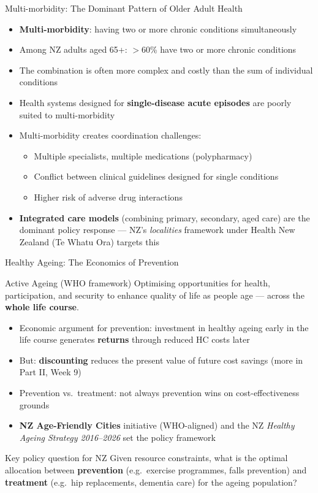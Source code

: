 \documentclass[aspectratio=169, 12pt]{beamer}
\begin{document}
\begin{frame}{Multi-morbidity: The Dominant Pattern of Older Adult Health}
  \begin{itemize}
    \item \textbf{Multi-morbidity}: having two or more chronic conditions simultaneously
    \item Among NZ adults aged 65+: $>$60\% have two or more chronic conditions
    \item The combination is often more complex and costly than the sum of individual conditions
    \item Health systems designed for \textbf{single-disease acute episodes} are poorly
          suited to multi-morbidity
    \item Multi-morbidity creates coordination challenges:
    \begin{itemize}
      \item Multiple specialists, multiple medications (polypharmacy)
      \item Conflict between clinical guidelines designed for single conditions
      \item Higher risk of adverse drug interactions
    \end{itemize}
    \item \textbf{Integrated care models} (combining primary, secondary, aged care) are
          the dominant policy response --- NZ's \textit{localities} framework under Health
          New Zealand (Te Whatu Ora) targets this
  \end{itemize}
\end{frame}

\begin{frame}{Healthy Ageing: The Economics of Prevention}
  \begin{block}{Active Ageing (WHO framework)}
    Optimising opportunities for health, participation, and security to enhance quality of
    life as people age --- across the \textbf{whole life course}.
  \end{block}
  \begin{itemize}
    \item Economic argument for prevention: investment in healthy ageing early in the life
          course generates \textbf{returns} through reduced HC costs later
    \item But: \textbf{discounting} reduces the present value of future cost savings
          (more in Part II, Week 9)
    \item Prevention vs.\ treatment: not always prevention wins on cost-effectiveness grounds
    \item \textbf{NZ Age-Friendly Cities} initiative (WHO-aligned) and the NZ
          \textit{Healthy Ageing Strategy 2016--2026} set the policy framework
  \end{itemize}
  \begin{alertblock}{Key policy question for NZ}
    Given resource constraints, what is the optimal allocation between \textbf{prevention}
    (e.g.\ exercise programmes, falls prevention) and \textbf{treatment} (e.g.\ hip replacements,
    dementia care) for the ageing population?
  \end{alertblock}
\end{frame}
\end{document}
